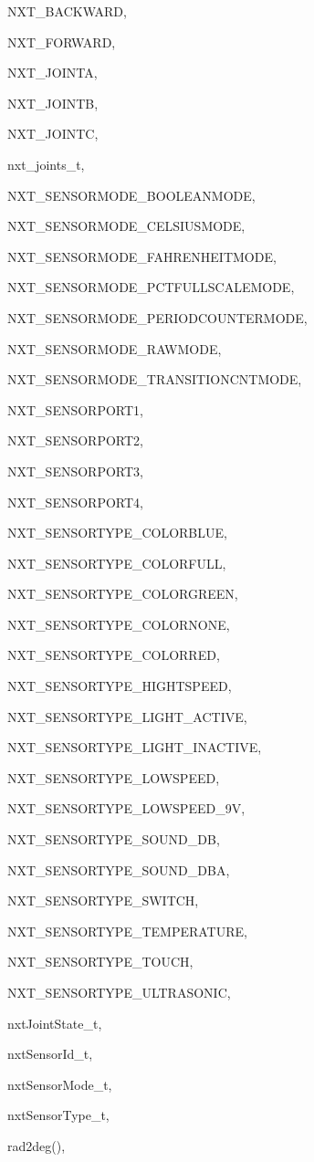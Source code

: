 \begin{theindex}
  \item NXT\_BACKWARD, 
  \item NXT\_FORWARD, 
  \item NXT\_JOINTA, 
  \item NXT\_JOINTB, 
  \item NXT\_JOINTC, 
  \item nxt\_joints\_t, 
  \item NXT\_SENSORMODE\_BOOLEANMODE, 
  \item NXT\_SENSORMODE\_CELSIUSMODE, 
  \item NXT\_SENSORMODE\_FAHRENHEITMODE, 
  \item NXT\_SENSORMODE\_PCTFULLSCALEMODE, 
  \item NXT\_SENSORMODE\_PERIODCOUNTERMODE, 
  \item NXT\_SENSORMODE\_RAWMODE, 
  \item NXT\_SENSORMODE\_TRANSITIONCNTMODE, 
  \item NXT\_SENSORPORT1, 
  \item NXT\_SENSORPORT2, 
  \item NXT\_SENSORPORT3, 
  \item NXT\_SENSORPORT4, 
  \item NXT\_SENSORTYPE\_COLORBLUE, 
  \item NXT\_SENSORTYPE\_COLORFULL, 
  \item NXT\_SENSORTYPE\_COLORGREEN, 
  \item NXT\_SENSORTYPE\_COLORNONE, 
  \item NXT\_SENSORTYPE\_COLORRED, 
  \item NXT\_SENSORTYPE\_HIGHTSPEED, 
  \item NXT\_SENSORTYPE\_LIGHT\_ACTIVE, 
  \item NXT\_SENSORTYPE\_LIGHT\_INACTIVE, 
  \item NXT\_SENSORTYPE\_LOWSPEED, 
  \item NXT\_SENSORTYPE\_LOWSPEED\_9V, 
  \item NXT\_SENSORTYPE\_SOUND\_DB, 
  \item NXT\_SENSORTYPE\_SOUND\_DBA, 
  \item NXT\_SENSORTYPE\_SWITCH, 
  \item NXT\_SENSORTYPE\_TEMPERATURE, 
  \item NXT\_SENSORTYPE\_TOUCH, 
  \item NXT\_SENSORTYPE\_ULTRASONIC, 
  \item nxtJointState\_t, 
  \item nxtSensorId\_t, 
  \item nxtSensorMode\_t, 
  \item nxtSensorType\_t, 

  \indexspace

  \item rad2deg(), 

\end{theindex}
